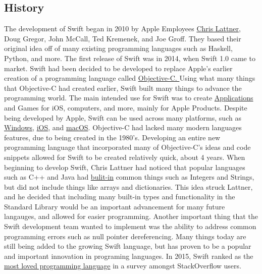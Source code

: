 \documentclass{article}
\theoremstyle{theorem}
\theoremstyle{definition}
\theoremstyle{remark}
\begin{document}
\subsection{History}
The development of Swift began in 2010 by Apple Employees \href{https://nondot.org/~sabre/}{Chris Lattner}, Doug Gregor, John McCall, Ted Kremenek, and Joe Groff. They based their original idea off of many existing programming languages such as Haskell, Python, and more. The first release of Swift was in 2014, when Swift 1.0 came to market. Swift had been decided to be developed to replace Apple's earlier creation of a programming language called \href{https://en.wikipedia.org/wiki/Objective-C#:~:text=10%20External%20links-,History,Programming%20Technology%20Center%20in%201981.}{Objective-C. }\newline\newline
Using what many things that Objective-C had created earlier, Swift built many things to advance the programming world. The main intended use for Swift was to create \href{https://www.swift.org/about/}{Applications} and Games for iOS, computers, and more, mainly for Apple Products. Despite being developed by Apple, Swift can be used across many platforms, such as \href{https://www.swift.org/blog/swift-on-windows/}{Windows}, \href{https://9to5mac.com/2021/12/15/apple-releases-long-awaited-swift-playgrounds-update-with-the-ability-to-create-apps-using-ipad/} {iOS}, and \href{https://gavinw.me/swift-macos/}{macOS}. Objective-C had lacked many modern languages features, due to being created in the 1980's. Developing an entire new programming language that incorporated many of Objective-C's ideas and code snippets allowed for Swift to be created relatively quick, about 4 years. \newline\newline
 When beginning to develop Swift, Chris Lattner had noticed that popular languages such as C++ and Java had \href{https://www.hackingwithswift.com/interviews/chris-lattner-how-did-you-start-creating-swift}{bulit-in} common things such as Integers and Strings, but did not include things like arrays and dictionaries. This idea struck Lattner, and he decided that including many built-in types and functionality in the Standard Library would be an important advancement for many future langauges, and allowed for easier programming. Another important thing that the Swift development team wanted to implement was the ability to address common programming errors such as null pointer dereferencing. Many things today are still being added to the growing Swift language, but has proven to be a popular and important innovation in programing languages. In 2015, Swift ranked as the \href{https://stackoverflow.blog/2015/04/07/stack-overflow-developer-survey-2015-the-results/}{most loved programming language} in a survey amongst StackOverflow users. 
\end{document}
